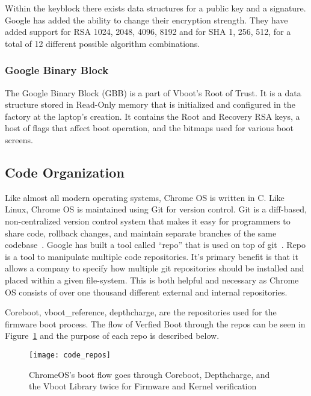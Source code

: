 \documentclass[../report.tex]{subfiles}
\begin{document}
Within the keyblock there exists data structures for a public key and a signature.
Google has added the ability to change their encryption strength.
They have added support for RSA 1024, 2048, 4096, 8192 and for SHA 1, 256, 512, for a total of 12 different possible algorithm combinations.

\subsubsection{Google Binary Block}

The Google Binary Block (GBB) is a part of Vboot's Root of Trust.
It is a data structure stored in Read-Only memory that is initialized and configured in the factory at the laptop's creation.
It contains the Root and Recovery RSA keys, a host of flags that affect boot operation, and the bitmaps used for various boot screens.


\subsection{Code Organization}

Like almost all modern operating systems, Chrome OS is written in C.
Like Linux, Chrome OS is maintained using Git for version control. 
Git is a diff-based, non-centralized version control system that makes it easy for programmers to share code, rollback changes, and maintain separate branches of the same codebase~\cite{git}.
Google has built a tool called ``repo'' that is used on top of git~\cite{repo}. 
Repo is a tool to manipulate multiple code repositories. 
It's primary benefit is that it allows a company to specify how multiple git repositories should be installed and placed within a given file-system.
This is both helpful and necessary as Chrome OS consists of over one thousand different external and internal repositories. 

Coreboot, vboot\_reference, depthcharge, are the repositories used for the firmware boot process.
The flow of Verfied Boot through the repos can be seen in Figure~\ref{fig:code_repos} and the purpose of each repo is described below.

\begin{figure}
  \centering
  \texttt{[image: code\_repos]}
  \caption{ChromeOS's boot flow goes through Coreboot, Depthcharge, and the Vboot Library twice for Firmware and Kernel verification}
  \label{fig:code_repos}
\end{figure}
\end{document}
